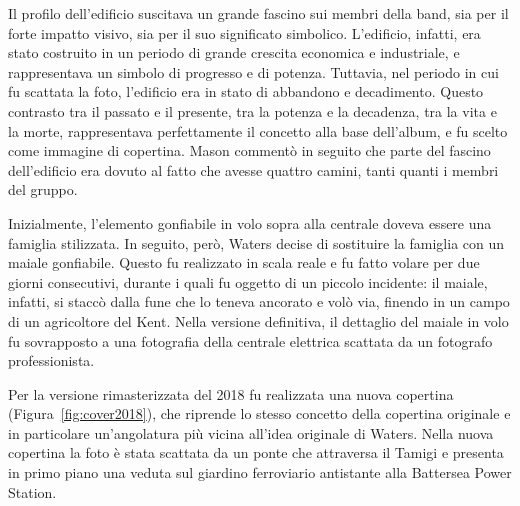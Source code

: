 \documentclass[class=book, crop=false, oneside, 12pt]{standalone}
\begin{document}
    Il profilo dell'edificio suscitava un grande fascino sui membri della band, sia per il forte impatto visivo, sia per il suo significato simbolico\cite{pinkfloyd2022animalsdocumentary}. L'edificio, infatti, era stato costruito in un periodo di grande crescita economica e industriale, e rappresentava un simbolo di progresso e di potenza. Tuttavia, nel periodo in cui fu scattata la foto, l'edificio era in stato di abbandono e decadimento. Questo contrasto tra il passato e il presente, tra la potenza e la decadenza, tra la vita e la morte, rappresentava perfettamente il concetto alla base dell'album, e fu scelto come immagine di copertina. Mason commentò in seguito che parte del fascino dell'edificio era dovuto al fatto che avesse quattro camini, tanti quanti i membri del gruppo\cite{mason2017inside}.

    Inizialmente, l'elemento gonfiabile in volo sopra alla centrale doveva essere una famiglia stilizzata. In seguito, però, Waters decise di sostituire la famiglia con un maiale gonfiabile. Questo fu realizzato in scala reale e fu fatto volare per due giorni consecutivi, durante i quali fu oggetto di un piccolo incidente: il maiale, infatti, si staccò dalla fune che lo teneva ancorato e volò via, finendo in un campo di un agricoltore del Kent\cite{pinkfloyd2022animalsdocumentary}. Nella versione definitiva, il dettaglio del maiale in volo fu sovrapposto a una fotografia della centrale elettrica scattata da un fotografo professionista\cite{mason2017inside}.
    
    Per la versione rimasterizzata del 2018 fu realizzata una nuova copertina (Figura~\ref{fig:cover2018}), che riprende lo stesso concetto della copertina originale e in particolare un'angolatura più vicina all'idea originale di Waters. Nella nuova copertina la foto è stata scattata da un ponte che attraversa il Tamigi e presenta in primo piano una veduta sul giardino ferroviario antistante alla Battersea Power Station.
\end{document}
